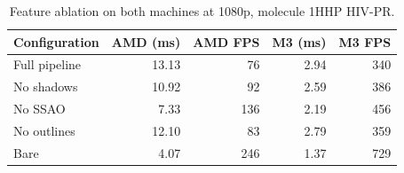 \begin{table}[H]
    \centering
    \small
    \begin{tabular}{lrrrr}
        \toprule
        Configuration & AMD (ms) & AMD FPS & M3 (ms) & M3 FPS \\
        \midrule
        Full pipeline & 13.13 & 76 & 2.94 & 340 \\
        No shadows & 10.92 & 92 & 2.59 & 386 \\
        No SSAO & 7.33 & 136 & 2.19 & 456 \\
        No outlines & 12.10 & 83 & 2.79 & 359 \\
        Bare & 4.07 & 246 & 1.37 & 729 \\
        \bottomrule
    \end{tabular}
    \caption{Feature ablation on both machines at 1080p, molecule 1HHP HIV-PR.}
    \label{tab:compare_ablation}
\end{table}
